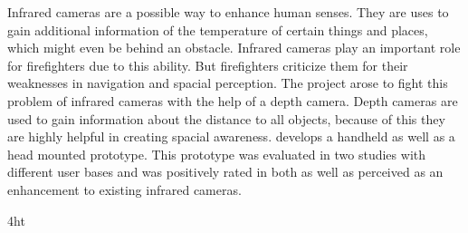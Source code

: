 \documentclass[
               fontsize=12pt, %
               paper=a4,
               oneside, %
               BCOR=3mm, %
               DIV=13,   %
               headinclude=true,
               footinclude=false,
               bibliography=totoc,
               headsepline,
               cleardoublepage=empty,
               parskip=half,
               final   %
               ]{scrbook}
\let\ifdeutsch\iftrue
\begin{document}
Infrared cameras are a possible way to enhance human senses.
They are uses to gain additional information of the temperature of certain things and places, which might even be behind an obstacle.
Infrared cameras play an important role for firefighters due to this ability.
But firefighters criticize them for their weaknesses in navigation and spacial perception.
The project \profire arose to fight this problem of infrared cameras with the help of a depth camera.
Depth cameras are used to gain information about the distance to all objects, because of this they are highly helpful in creating spacial awareness.
\profire develops a handheld as well as a head mounted prototype.
This prototype was evaluated in two studies with different user bases and was positively  rated in both as well as perceived as an enhancement to existing infrared cameras.
\cleardoublepage



\iftex4ht
\else
{}
\fi

%
%

%
%
%
\tableofcontents


\begingroup 
\makeatletter
  \def\@makeschapterhead#1{%
  \vspace*{10\p@}%
  {\parindent \z@ \raggedright \reset@font
            \normalfont \vphantom{\@chapapp{} \thechapter}
        \par\nobreak\vspace*{10\p@}%
        \interlinepenalty\@M
    {\huge \bfseries %
    \ifdeutsch
    \fontfamily{phv}\selectfont
    \fi
    #1\par\nobreak}
\makebox[\textwidth]{\hrulefill}%
    \par\nobreak
    \vskip 5\p@
  }}
\makeatother
\let\cleardoublepage\clearpage
\listoffigures
\let\cleardoublepage\relax
\end{document}
